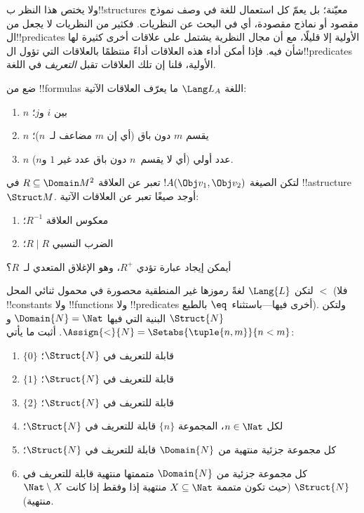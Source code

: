\documentclass[../../../include/open-logic-section]{subfiles}
\begin{document}
\begin{explain}
ولا يختص هذا النظر ب!!{structure}s معيّنة؛ بل يعمّ كل استعمال
للغة في وصف نموذج مقصود أو نماذج مقصودة، أي في البحث عن النظريات.
فكثير من النظريات لا يجعل من ال!!{predicate}s الأولية إلا قليلًا،
مع أن مجال النظرية يشتمل على علاقات أخرى كثيرة لها شأن فيه.
فإذا أمكن أداء هذه العلاقات أداءً منتظمًا بالعلاقات التي تؤول
ال!!{predicate}s الأولية، قلنا إن تلك العلاقات تقبل
\emph{التعريف} في اللغة.
\end{explain}

\begin{prob}
ضع من !!{formula}s اللغة $\Lang L_A$ ما يعرّف العلاقات الآتية:
\begin{enumerate}
\item $n$ بين $i$ و$j$؛
\item $n$ يقسم $m$ دون باق (أي إن $m$ مضاعف لـ~$n$)؛
\item $n$ عدد أولي (أي لا يقسم~$n$ دون باق عدد غير $1$ و$n$).
\end{enumerate}
\end{prob}

\begin{prob}
لتكن الصيغة $!A(\Obj v_1, \Obj v_2)$ تعبر عن العلاقة $R
\subseteq \Domain M^2$ في !!a{structure}~$\Struct M$. أوجد صيغًا
تعبر عن العلاقات الآتية:
\begin{enumerate}
\item معكوس العلاقة $R^{-1}$؛
\item الضرب النسبي $R \mid R$؛
\end{enumerate}
أيمكن إيجاد عبارة تؤدي $R^+$، وهو الإغلاق المتعدي لـ~$R$؟
\end{prob}

\begin{prob}
لتكن $\Lang{L}$ لغةً رموزها غير المنطقية محصورة في محمول ثنائي المحل
$<$ (فلا !!{constant}s ولا !!{function}s ولا !!{predicate}s أخرى
فيها---باستثناء~$\eq$ بالطبع). ولتكن $\Struct{N}$ البنية التي فيها
$\Domain{N} = \Nat$ و$\Assign{<}{N} = \Setabs{\tuple{n,m}}{n <
  m}$. أثبت ما يأتي:
\begin{enumerate}
\item $\{ 0 \}$ قابلة للتعريف في $\Struct{N}$؛
\item $\{ 1 \}$ قابلة للتعريف في $\Struct{N}$؛
\item $\{ 2 \}$ قابلة للتعريف في $\Struct{N}$؛
\item لكل $n \in \Nat$، المجموعة $\{ n \}$ قابلة للتعريف في
  $\Struct{N}$؛
\item كل مجموعة جزئية منتهية من $\Domain{N}$ قابلة للتعريف في
  $\Struct{N}$؛
\item كل مجموعة جزئية من $\Domain{N}$ متممتها منتهية قابلة للتعريف
  في $\Struct{N}$ (حيث تكون متممة $X \subseteq \Nat$ منتهية إذا
  وفقط إذا كانت $\Nat \setminus X$ منتهية).
\end{enumerate}
\end{prob}
\end{document}
